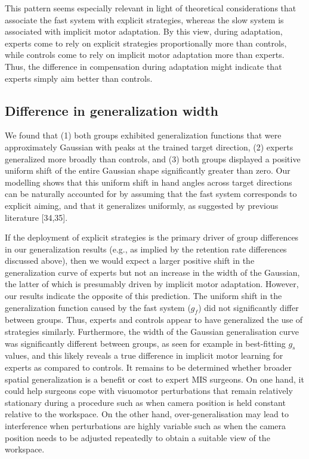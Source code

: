 \documentclass[man, 11pt, longtable, floatsintext, notab]{apa6}
\begin{document}
This pattern seems especially relevant in light of
theoretical considerations that associate the fast system
with explicit strategies, whereas the slow system is
associated with implicit motor adaptation. By this view,
during adaptation, experts come to rely on explicit
strategies proportionally more than controls, while controls
come to rely on implicit motor adaptation more than experts.
Thus, the difference in compensation during adaptation might
indicate that experts simply aim better than controls.

\subsection{Difference in generalization width}
We found that (1) both groups exhibited generalization
functions that were approximately Gaussian with peaks at the
trained target direction, (2) experts generalized more
broadly than controls, and (3) both groups displayed a
positive uniform shift of the entire Gaussian shape
significantly greater than zero. Our modelling shows that
this uniform shift in hand angles across target directions
can be naturally accounted for by assuming that the fast
system corresponds to explicit aiming, and that it
generalizes uniformly, as suggested by previous literature
[34,35].

If the deployment of explicit strategies is the primary
driver of group differences in our generalization results
(e.g., as implied by the retention rate differences
discussed above), then we would expect a larger positive
shift in the generalization curve of experts but not an
increase in the width of the Gaussian, the latter of which
is presumably driven by implicit motor adaptation. However,
our results indicate the opposite of this prediction. The
uniform shift in the generalization function caused by the
fast system ($g_f$) did not significantly differ between
groups. Thus, experts and controls appear to have
generalized the use of strategies similarly. Furthermore,
the width of the Gaussian generalisation curve was
significantly different between groups, as seen for example
in best-fitting $g_s$ values, and this likely reveals a true
difference in implicit motor learning for experts as
compared to controls. It remains to be determined whether
broader spatial generalization is a benefit or cost to
expert MIS surgeons. On one hand, it could help surgeons
cope with visuomotor perturbations that remain relatively
stationary during a procedure such as when camera position
is held constant relative to the workspace. On the other
hand, over-generalisation may lead to interference when
perturbations are highly variable such as when the camera
position needs to be adjusted repeatedly to obtain a
suitable view of the workspace.
\end{document}
